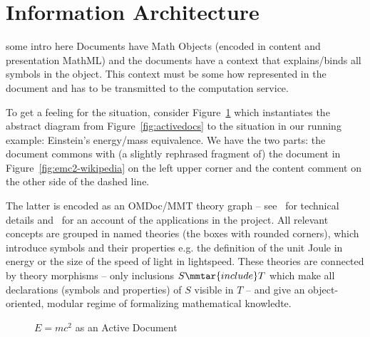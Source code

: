 \section{Information Architecture}\label{sec:infarch}

\begin{oldpart}{some intro here}
  Documents have Math Objects (encoded in content and presentation MathML) and the documents
  have a context  that explains/binds all symbols in the object. This context
  must be some how represented in the document and has to be transmitted to the
  computation service.
\end{oldpart}

To get a feeling for the situation, consider Figure~\ref{fig:emc-adp} which instantiates
the abstract diagram from Figure~\ref{fig:activedocs} to the situation in our running
example: Einstein's energy/mass equivalence. We have the two parts: the document commons
with (a slightly rephrased fragment of) the document in Figure~\ref{fig:emc2-wikipedia}
on the left upper corner and the content comment on the other side of the dashed line. 

The latter is encoded as an OMDoc/MMT theory graph -- see~\cite{RabKoh:WSMSML13} for
technical details and~\cite{DehKohKon:iop16,ODK-D6.2} for an account of the applications
in the \pn project. All relevant concepts are grouped in named theories (the boxes with
rounded corners), which introduce symbols and their properties e.g. the definition of the
unit Joule in \textsf{energy} or the size of the speed of light in
\textsf{lightspeed}. These theories are connected by theory morphisms -- only inclusions
$S\mmtar{include}T$ which make all declarations (symbols and properties) of $S$ visible in
$T$ -- and give an object-oriented, modular regime of formalizing mathematical knowledte.

\begin{figure}\centering
  {\footnotesize}
  \caption{$E=mc^2$ as an Active Document}\label{fig:emc-adp}
\end{figure}

